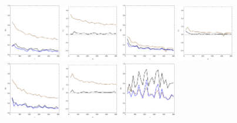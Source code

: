 \documentclass[
twoside,
openright,
titlepage,
numbers=noenddot,
headinclude,%
footinclude=true,
dottedtoc, %
ngerman,
american, %
pagesize=pdftex,
]{book}
\begin{document}
\begin{example}
\begin{figure}[H]
			\includegraphics[width=0.22\textwidth]{figures/2DTVexamples/e3l1}
			\includegraphics[width=0.22\textwidth]{figures/2DTVexamples/e3l2}
			\includegraphics[width=0.22\textwidth]{figures/2DTVexamples/e3sn1}
			\includegraphics[width=0.22\textwidth]{figures/2DTVexamples/e3sn2}
			\includegraphics[width=0.22\textwidth]{figures/2DTVexamples/e3n+l1}
			\includegraphics[width=0.22\textwidth]{figures/2DTVexamples/e3n+l2}
			\includegraphics[width=0.22\textwidth]{figures/2DTVexamples/e3sn+t1}

\end{figure}
\end{example}
\end{document}
